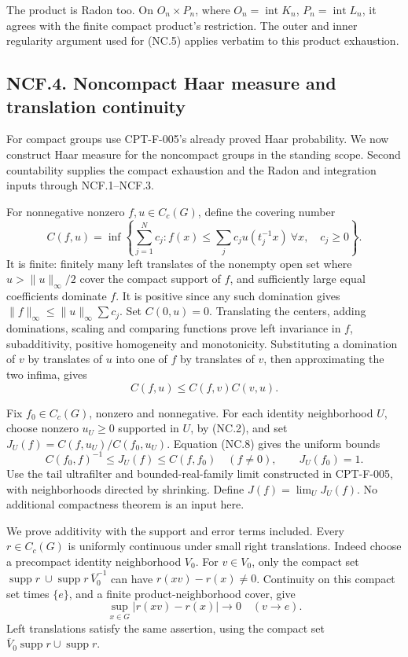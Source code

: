 \documentclass[
  11pt,
]{article}
\begin{document}
The product is Radon too. On \(O_n\times P_n\), where
\(O_n=\operatorname{int}K_n\), \(P_n=\operatorname{int}L_n\), it agrees
with the finite compact product's restriction. The outer and inner
regularity argument used for (NC.5) applies verbatim to this product
exhaustion.

\subsection{NCF.4. Noncompact Haar measure and translation
continuity}\label{ncf.4.-noncompact-haar-measure-and-translation-continuity}

For compact groups use CPT-F-005's already proved Haar probability. We
now construct Haar measure for the noncompact groups in the standing
scope. Second countability supplies the compact exhaustion and the Radon
and integration inputs through NCF.1--NCF.3.

For nonnegative nonzero \(f,u\in C_c(G)\), define the covering number \[
 C(f,u)=\inf\left\{\sum_{j=1}^N c_j:
 f(x)\leq\sum_jc_j u(t_j^{-1}x)\ \forall x,\quad c_j\geq0\right\}.
                                                               \tag{NC.7}
\] It is finite: finitely many left translates of the nonempty open set
where \(u>\|u\|_\infty/2\) cover the compact support of \(f\), and
sufficiently large equal coefficients dominate \(f\). It is positive
since any such domination gives
\(\|f\|_\infty\leq\|u\|_\infty\sum c_j\). Set \(C(0,u)=0\). Translating
the centers, adding dominations, scaling and comparing functions prove
left invariance in \(f\), subadditivity, positive homogeneity and
monotonicity. Substituting a domination of \(v\) by translates of \(u\)
into one of \(f\) by translates of \(v\), then approximating the two
infima, gives \[
 C(f,u)\leq C(f,v)C(v,u).                              \tag{NC.8}
\]

Fix \(f_0\in C_c(G)\), nonzero and nonnegative. For each identity
neighborhood \(U\), choose nonzero \(u_U\geq0\) supported in \(U\), by
(NC.2), and set \(J_U(f)=C(f,u_U)/C(f_0,u_U)\). Equation (NC.8) gives
the uniform bounds \[
 C(f_0,f)^{-1}\leq J_U(f)\leq C(f,f_0)\quad(f\ne0),
 \qquad J_U(f_0)=1.                                  \tag{NC.9}
\] Use the tail ultrafilter and bounded-real-family limit constructed in
CPT-F-005, with neighborhoods directed by shrinking. Define
\(J(f)=\lim_U J_U(f)\). No additional compactness theorem is an input
here.

We prove additivity with the support and error terms included. Every
\(r\in C_c(G)\) is uniformly continuous under small right translations.
Indeed choose a precompact identity neighborhood \(V_0\). For
\(v\in V_0\), only the compact set
\(\operatorname{supp}r\ \cup\operatorname{supp}r\,\overline V_0^{-1}\)
can have \(r(xv)-r(x)\ne0\). Continuity on this compact set times
\(\{e\}\), and a finite product-neighborhood cover, give \[
 \sup_{x\in G}|r(xv)-r(x)|\longrightarrow0
 \quad(v\to e).
                                                               \tag{NC.10}
\] Left translations satisfy the same assertion, using the compact set
\(\overline V_0\operatorname{supp}r\cup\operatorname{supp}r\).
\end{document}
